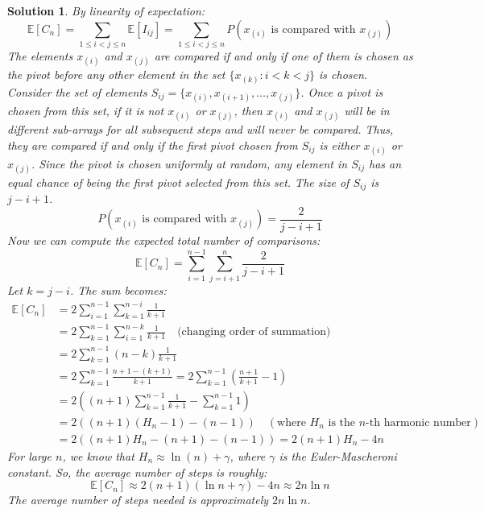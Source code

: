 \documentclass[12pt]{amsart}
\newtheorem*{solution}{Solution}
\begin{document}
\begin{solution}
By linearity of expectation:
$$\mathbb{E}[C_n] = \sum_{1 \le i < j \le n} \mathbb{E}[I_{ij}] = \sum_{1 \le i < j \le n} P(x_{(i)} \text{ is compared with } x_{(j)})$$
The elements $x_{(i)}$ and $x_{(j)}$ are compared if and only if one of them is chosen as the pivot before any other element in the set $\{x_{(k)} : i < k < j\}$ is chosen.
Consider the set of elements $S_{ij} = \{x_{(i)}, x_{(i+1)}, \ldots, x_{(j)}\}$. Once a pivot is chosen from this set, if it is not $x_{(i)}$ or $x_{(j)}$, then $x_{(i)}$ and $x_{(j)}$ will be in different sub-arrays for all subsequent steps and will never be compared.
Thus, they are compared if and only if the first pivot chosen from $S_{ij}$ is either $x_{(i)}$ or $x_{(j)}$.
Since the pivot is chosen uniformly at random, any element in $S_{ij}$ has an equal chance of being the first pivot selected from this set. The size of $S_{ij}$ is $j - i + 1$.
$$ P(x_{(i)} \text{ is compared with } x_{(j)}) = \frac{2}{j-i+1} $$
Now we can compute the expected total number of comparisons:
$$ \mathbb{E}[C_n] = \sum_{i=1}^{n-1} \sum_{j=i+1}^{n} \frac{2}{j-i+1} $$
Let $k = j-i$. The sum becomes:
\begin{align*}
\mathbb{E}[C_n] &= 2 \sum_{i=1}^{n-1} \sum_{k=1}^{n-i} \frac{1}{k+1} \\
&= 2 \sum_{k=1}^{n-1} \sum_{i=1}^{n-k} \frac{1}{k+1} \quad \text{(changing order of summation)} \\
&= 2 \sum_{k=1}^{n-1} (n-k) \frac{1}{k+1} \\
&= 2 \sum_{k=1}^{n-1} \frac{n+1-(k+1)}{k+1} = 2 \sum_{k=1}^{n-1} \left(\frac{n+1}{k+1} - 1\right) \\
&= 2 \left( (n+1) \sum_{k=1}^{n-1} \frac{1}{k+1} - \sum_{k=1}^{n-1} 1 \right) \\
&= 2 \left( (n+1) (H_n - 1) - (n-1) \right) \quad (\text{where } H_n \text{ is the } n\text{-th harmonic number}) \\
&= 2( (n+1)H_n - (n+1) - (n-1) ) = 2(n+1)H_n - 4n
\end{align*}
For large $n$, we know that $H_n \approx \ln(n) + \gamma$, where $\gamma$ is the Euler-Mascheroni constant.
So, the average number of steps is roughly:
$$ \mathbb{E}[C_n] \approx 2(n+1)(\ln n + \gamma) - 4n \approx 2n \ln n $$
The average number of steps needed is approximately $2n \ln n$.
\end{solution}
\end{document}
